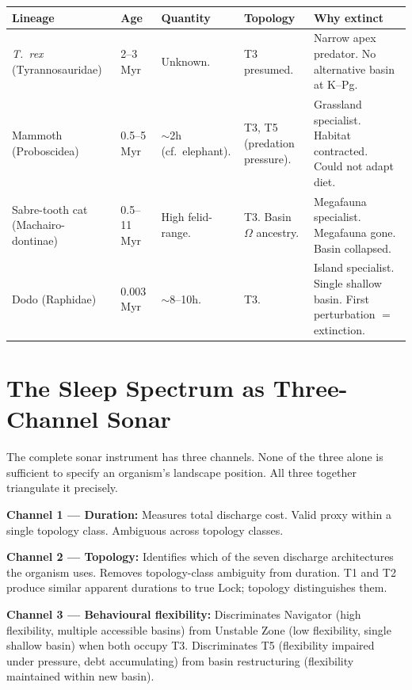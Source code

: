 \documentclass[10pt, a4paper]{article}
\begin{document}
\begin{center}
\small
\begin{tabular}{p{2.2cm}p{1.2cm}p{2.2cm}
               p{2.2cm}p{3.5cm}}
\toprule
\textbf{Lineage} &
\textbf{Age} &
\textbf{Quantity} &
\textbf{Topology} &
\textbf{Why extinct}\\
\midrule
\textit{T.~rex}
(Tyranno\-sauridae) &
2--3\,Myr &
Unknown. &
T3 presumed. &
Narrow apex predator.
No alternative basin
at K--Pg.\\[0.3em]
Mammoth
(Proboscidea) &
0.5--5\,Myr &
$\sim$2h
(cf.\ elephant). &
T3, T5
(predation
pressure). &
Grassland specialist.
Habitat contracted.
Could not adapt diet.\\[0.3em]
Sabre-tooth cat
(Machairo-\-dontinae) &
0.5--11\,Myr &
High felid-range. &
T3.
Basin~$\Omega$
ancestry. &
Megafauna specialist.
Megafauna gone.
Basin collapsed.\\[0.3em]
Dodo
(Raphidae) &
0.003\,Myr &
$\sim$8--10h. &
T3. &
Island specialist.
Single shallow basin.
First perturbation
$=$ extinction.\\
\bottomrule
\end{tabular}
\end{center}

\section{The Sleep Spectrum as
Three-Channel Sonar}
\label{sec:sonar}

The complete sonar instrument has three
channels. None of the three alone is
sufficient to specify an organism's
landscape position. All three together
triangulate it precisely.

\textbf{Channel 1 --- Duration:}
Measures total discharge cost. Valid
proxy within a single topology class.
Ambiguous across topology classes.

\textbf{Channel 2 --- Topology:}
Identifies which of the seven discharge
architectures the organism uses. Removes
topology-class ambiguity from duration.
T1 and T2 produce similar apparent
durations to true Lock; topology
distinguishes them.

\textbf{Channel 3 --- Behavioural
flexibility:}
Discriminates Navigator (high flexibility,
multiple accessible basins) from Unstable
Zone (low flexibility, single shallow
basin) when both occupy T3. Discriminates
T5 (flexibility impaired under pressure,
debt accumulating) from basin restructuring
(flexibility maintained within new basin).
\end{document}
